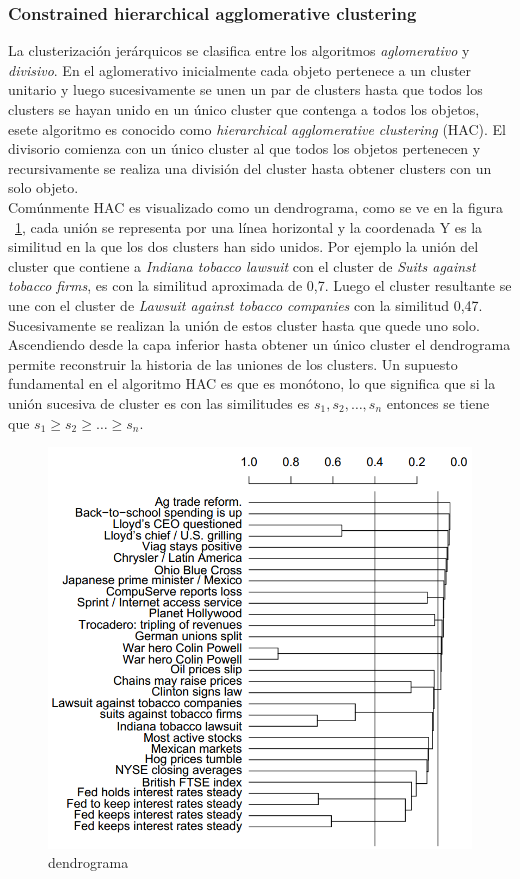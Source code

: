 \subsubsection{Constrained hierarchical agglomerative clustering}
La clusterización jerárquicos se clasifica entre los algoritmos \textit{aglomerativo} y \textit{divisivo}. En el aglomerativo inicialmente cada objeto pertenece a un cluster unitario y luego sucesivamente se unen un par de clusters hasta que todos los clusters se hayan unido en un único cluster que contenga a todos los objetos, esete algoritmo es conocido como \textit{hierarchical agglomerative clustering} (HAC). El divisorio comienza con un único cluster al que todos los objetos pertenecen y recursivamente se realiza una división del cluster hasta obtener clusters con un solo objeto.\\
Comúnmente HAC es visualizado como un dendrograma, como se ve en la figura ~\ref{des:Dendrogram}, cada unión se representa por una línea horizontal y la coordenada Y es la similitud en la que los dos clusters han sido unidos. Por ejemplo la unión del cluster que contiene a \textit{Indiana tobacco lawsuit} con el cluster de \textit{Suits against tobacco firms}, es con la similitud aproximada de 0,7. Luego el cluster resultante se une con el cluster de \textit{Lawsuit against tobacco companies} con la similitud 0,47. Sucesivamente se realizan la unión de estos cluster hasta que quede uno solo.\\
Ascendiendo desde la capa inferior hasta obtener un único cluster el dendrograma permite reconstruir la historia de las uniones de los clusters. Un supuesto fundamental en el algoritmo HAC es que es monótono, lo que significa que si la unión sucesiva de cluster es con las similitudes es $s_1,s_2,\ldots,s_n$ entonces se tiene que $s_1 \geq s_2 \geq \ldots \geq s_n$.\\

\begin{figure}[H]
  \centering
    \includegraphics[width=1\textwidth]{img/Dendrogram.png}
  \caption{dendrograma}
  \label{des:Dendrogram}
\end{figure}

